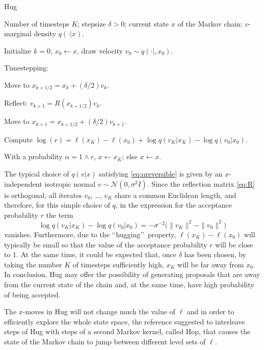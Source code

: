 \documentclass[10pt]{article}
\begin{document}
\begin{algorithm}[t]
	\caption{Hug} \label{alg:hug}
\begin{algorithmic}[b]
		\Require Number of timesteps \(K\); stepsize \(\delta>0\); current state \(x\) of the Markov chain; \(v\)-marginal density  \(q(\cdot|x)\).


         Initialize \(k = 0\), \(x_0\leftarrow x\), draw velocity \(v_0\sim q(\cdot|,x_0)\).

		  Timestepping: 

            Move to \(x_{k+1/2} = x_k +(\delta/2) v_k\).

            Reflect: \(v_{k+1} = R(x_{k+1/2})v_k\).

            Move to \(x_{k+1} = x_{k+1/2} +(\delta/2) v_{k+1}\).

          \EndFor
           		
		Compute \(\log(r) = \ell(x_K)-\ell(x_0)+\log q(v_K|x_K)-\log q(v_0|x_0)\).

    With a probability \(\alpha = 1\wedge r\), \(x\leftarrow x_K\); else \(x\leftarrow x\).
\end{algorithmic}
\end{algorithm}

The typical choice of \(q(v|x)\) satisfying \eqref{eq:qreversible} is given by an \(x\)-independent isotropic normal \(v\sim {\mathcal N}(0,\sigma^2 I)\). Since the reflection matrix \eqref{eq:R} is orthogonal, all iterates \(v_0\), \dots, \(v_K\) share a common Euclidean length, and therefore, for this simple choice of \(q\), in the expression for the acceptance probability \(r\) the term \[\log q(v_K|x_K)-\log q(v_0|x_0)= -\sigma^{-2} \big(\|v_K\|^2-\|v_0\|^2\big)\] vanishes.
Furthermore, due to the \lq\lq hugging\rq\rq\ property,  \(\ell(x_K)-\ell(x_0)\) will typically be small so that the value of the acceptance probability \(r\) will be close to \(1\).
At the same time, it could be expected that, once \(\delta\) has been chosen, by taking the number \(K\) of timesteps sufficiently high, \(x_K\) will be far away from \(x_0\). In conclusion, Hug may offer the possibility of generating proposals that are away from the current state of the chain and, at the same time, have high probability of being accepted.

The \(x\)-moves in Hug will not change much the value of \(\ell\) and in order to efficiently explore the whole state space,
the reference \cite{LS23} suggested to interleave steps of Hug with steps of a second Markov kernel, called Hop, that causes the state of the Markov chain to jump between different level sets   of \(\ell\).
\end{document}
